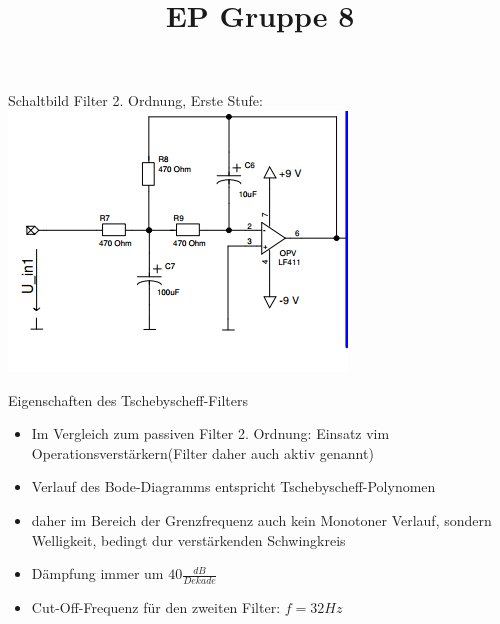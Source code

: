 \documentclass[compress,11pt]{beamer}
\title{EP Gruppe 8}
\begin{document}
\begin{frame}

Schaltbild Filter 2. Ordnung, Erste Stufe:\\
\includegraphics[width=.7\textwidth]{schalt/schalt_41}

\end{frame}

\begin{frame}
\begin{block}{Eigenschaften des Tschebyscheff-Filters}
\begin{itemize}
\item Im Vergleich zum passiven Filter 2. Ordnung: Einsatz vim Operationsverstärkern(Filter daher auch aktiv genannt)
\item Verlauf des Bode-Diagramms entspricht Tschebyscheff-Polynomen
\item daher im Bereich der Grenzfrequenz auch kein Monotoner Verlauf, sondern Welligkeit, bedingt dur verstärkenden Schwingkreis
\item Dämpfung immer um $40 \frac{dB}{Dekade}$
\item Cut-Off-Frequenz für den zweiten Filter: $f = 32 Hz$
\end{itemize}
\end{block}



\end{frame}
\end{document}
